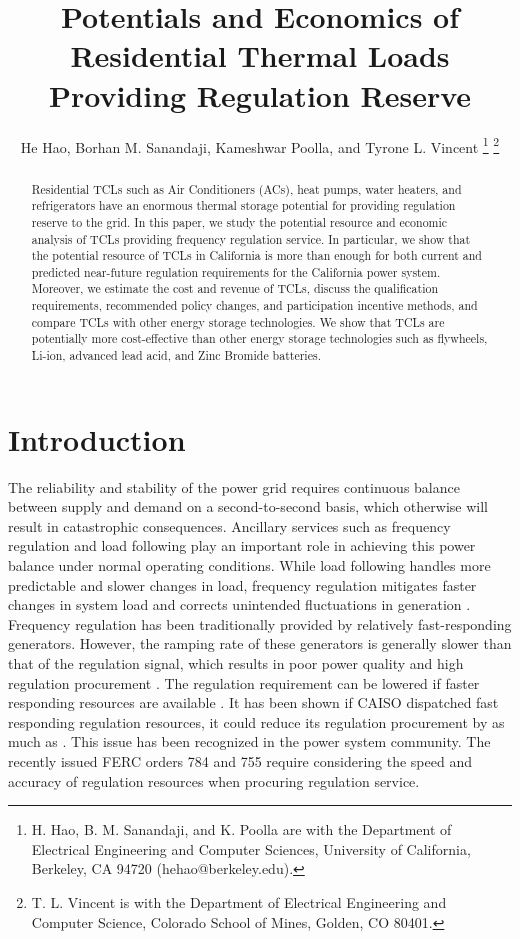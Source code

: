 \documentclass[onecolumn,journal]{IEEEtran}
\title{Potentials and Economics of Residential Thermal Loads Providing Regulation Reserve}
\author{
He Hao, Borhan M. Sanandaji, Kameshwar Poolla, and Tyrone L. Vincent 
\thanks{H. Hao, B. M. Sanandaji, and K. Poolla are with the Department of Electrical Engineering and Computer Sciences, University of California, Berkeley, CA 94720 (hehao@berkeley.edu).}
\thanks{T. L. Vincent is with the Department of Electrical Engineering and Computer Science, Colorado School of Mines, Golden, CO 80401.}
}
\begin{document}
\maketitle

\begin{abstract}
Residential \acp{TCL} such as Air Conditioners (ACs), heat pumps, water heaters, and refrigerators have an enormous thermal storage potential for providing regulation reserve to the grid. In this paper, we study the potential resource and economic analysis of TCLs providing frequency regulation service. In particular, we show that the potential resource of \acp{TCL} in California is more than enough for both current and predicted near-future regulation requirements for the California power system. Moreover, we estimate the cost and revenue of \acp{TCL}, discuss the qualification requirements, recommended policy changes, and participation incentive methods, and compare \acp{TCL} with other energy storage technologies. We show that \acp{TCL} are potentially more cost-effective than other energy storage technologies such as flywheels, Li-ion, advanced lead acid, and Zinc Bromide batteries.  
\end{abstract}


\acresetall
\section{Introduction}\label{sec:intro}

The reliability and stability of the power grid requires continuous balance between supply and demand on a second-to-second basis, which otherwise will result in catastrophic consequences. Ancillary services such as frequency regulation and load following play an important role in achieving this power balance under normal operating conditions. While load following handles more predictable and slower changes in load, frequency regulation mitigates faster changes in system load and corrects unintended fluctuations in generation \cite{AS_Kirby}.  Frequency regulation has been traditionally provided by relatively fast-responding generators. However, the ramping rate of these generators is generally slower than that of the regulation signal, which results in poor power quality and high regulation procurement \cite{AS_Kirby, ERCOT}. The regulation requirement can be lowered if faster responding resources are available \cite{kema2009fastresponse}. It has been shown if \ac{CAISO} dispatched fast responding regulation resources, it could reduce its regulation procurement by as much as  \cite{pnnl2008value}. This issue has been recognized in the power system community. The recently issued FERC orders 784 and 755 require considering the speed and accuracy of regulation resources when procuring regulation service.
\end{document}
